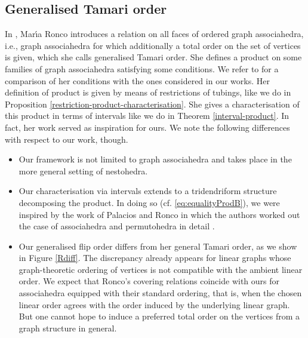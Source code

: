 \documentclass{article}
\theoremstyle{plain}
\theoremstyle{definition}
\begin{document}
\subsection{Generalised Tamari order}
In \cite{RoncoGTO}, Mar\'{\i}a Ronco introduces a relation on all faces of ordered graph associahedra, i.e., graph associahedra for which additionally a total order on the set of vertices is given, which she calls generalised Tamari order. She defines
a product on some families of graph associahedra satisfying some conditions. We refer to \cite{PLBJ2} for a comparison of her conditions with the ones considered in our works.
Her definition of product is given by means of restrictions of tubings, like we do in Proposition \ref{restriction-product-characterisation}. She gives a characterisation of this product in terms of intervals like we do in Theorem \ref{interval-product}. 
In fact, her work served as inspiration for ours. We note the following differences with respect to our work, though.
\begin{itemize}
\item Our framework is not limited to graph associahedra and takes place in the more general setting of nestohedra. 
\item Our characterisation via intervals extends to a tridendriform structure decomposing the product. In doing so (cf. \eqref{eq:equalityProdB}), we were inspired by the work of Palacios and Ronco in which the authors worked out the case of associahedra and permutohedra in detail \cite{PalaciosRonco}.
\item Our generalised flip order differs from her general Tamari order, as we show in Figure \ref{Rdiff}. The discrepancy already appears for linear graphs whose graph-theoretic ordering of vertices is not compatible with the ambient linear order. We expect that Ronco's covering relations coincide with ours for associahedra equipped with their standard ordering, that is, when the chosen linear order agrees with the order induced by the underlying linear graph. But one cannot hope to induce a preferred total order on the vertices from a graph structure in general.
\end{itemize}
 
\end{document}
